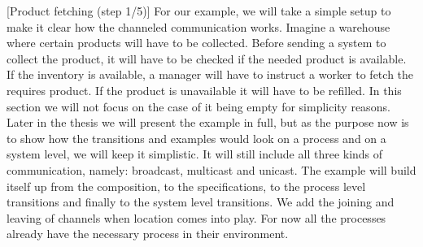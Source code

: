 \begin{example}\label{ex1}[Product fetching (step 1/5)]
    For our example, we will take a simple setup to make it clear how the channeled communication works. Imagine a warehouse where certain products will have to be collected. Before sending a system to collect the product, it will have to be checked if the needed product is available. If the inventory is available, a manager will have to instruct a worker to fetch the requires product. If the product is unavailable it will have to be refilled. In this section we will not focus on the case of it being empty for simplicity reasons. Later in the thesis we will present the example in full, but as the purpose now is to show how the transitions and examples would look on a process and on a system level, we will keep it simplistic. It will still include all three kinds of communication, namely: broadcast, multicast and unicast. The example will build itself up from the composition, to the specifications, to the process level transitions and finally to the system level transitions. We add the joining and leaving of channels when location comes into play. For now all the processes already have the necessary process in their environment.
\end{example}

